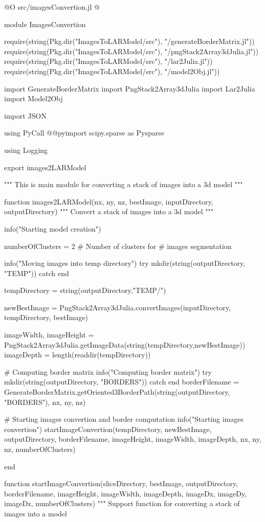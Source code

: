 \documentclass[11pt,oneside]{article}	%
\begin{document}
@O src/imagesConvertion.jl
@{module ImagesConvertion

require(string(Pkg.dir("ImagesToLARModel/src"), "/generateBorderMatrix.jl"))
require(string(Pkg.dir("ImagesToLARModel/src"), "/pngStack2Array3dJulia.jl"))
require(string(Pkg.dir("ImagesToLARModel/src"), "/lar2Julia.jl"))
require(string(Pkg.dir("ImagesToLARModel/src"), "/model2Obj.jl"))

import GenerateBorderMatrix
import PngStack2Array3dJulia
import Lar2Julia
import Model2Obj

import JSON

using PyCall
@@pyimport scipy.sparse as Pysparse

using Logging

export images2LARModel

"""
This is main module for converting a stack
of images into a 3d model
"""

function images2LARModel(nx, ny, nz, bestImage, inputDirectory, outputDirectory)
  """
  Convert a stack of images into a 3d model
  """

  info("Starting model creation")

  numberOfClusters = 2 # Number of clusters for
                       # images segmentation

  info("Moving images into temp directory")
  try
    mkdir(string(outputDirectory, "TEMP"))
  catch
  end

  tempDirectory = string(outputDirectory,"TEMP/")

  newBestImage = PngStack2Array3dJulia.convertImages(inputDirectory, tempDirectory, bestImage)

  imageWidth, imageHeight = PngStack2Array3dJulia.getImageData(string(tempDirectory,newBestImage))
  imageDepth = length(readdir(tempDirectory))

  # Computing border matrix
  info("Computing border matrix")
  try
    mkdir(string(outputDirectory, "BORDERS"))
  catch
  end
  borderFilename = GenerateBorderMatrix.getOriented3BorderPath(string(outputDirectory, "BORDERS"), nx, ny, nz)

  # Starting images convertion and border computation
  info("Starting images convertion")
  startImageConvertion(tempDirectory, newBestImage, outputDirectory, borderFilename,
                       imageHeight, imageWidth, imageDepth,
                       nx, ny, nz,
                       numberOfClusters)

end


function startImageConvertion(sliceDirectory, bestImage, outputDirectory, borderFilename,
                              imageHeight, imageWidth, imageDepth,
                              imageDx, imageDy, imageDz,
                              numberOfClusters)
  """
  Support function for converting a stack of images into a model

}
\end{document}
